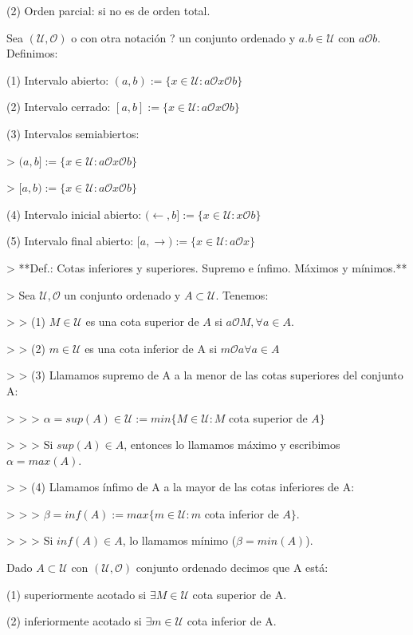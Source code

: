 (2) Orden parcial: si no es de orden total.

Sea $(\mathcal{U},\mathcal{O})$ o con otra notación ? un conjunto ordenado y $a.b \in \mathcal{U}$ con $a \mathcal{O} b$. Definimos:

(1) Intervalo abierto: $(a,b) := \{x \in \mathcal{U}: a \mathcal{O} x \mathcal{O} b\}$

(2) Intervalo cerrado: $[a,b] := \{x \in \mathcal{U}: a \mathcal{O} x \mathcal{O} b\}$

(3) Intervalos semiabiertos:

> $(a,b] := \{x \in \mathcal{U}: a \mathcal{O} x \mathcal{O} b\}$

> $[a,b) := \{x \in \mathcal{U}: a \mathcal{O} x \mathcal{O} b\}$

(4) Intervalo inicial abierto: $(\leftarrow, b] := \{x \in \mathcal{U}: x \mathcal{O} b\}$

(5) Intervalo final abierto: $[a, \rightarrow) := \{x \in \mathcal{U}: a \mathcal{O} x\}$

> **Def.: Cotas inferiores y superiores. Supremo e ínfimo. Máximos y mínimos.**

> Sea $\mathcal{U},\mathcal{O}$ un conjunto ordenado y $A \subset \mathcal{U}$. Tenemos:

> > (1) $M \in \mathcal{U}$ es una cota superior de $A$ si $a \mathcal{O} M, \forall a \in A$.

> > (2) $m \in \mathcal{U}$ es una cota inferior de A si $m \mathcal{O} a \forall a \in A$

> > (3) Llamamos supremo de A a la menor de las cotas superiores del conjunto A:

> > > $\alpha = sup(A) \in \mathcal{U} := min \{M \in \mathcal{U}: M$ cota superior de $A\}$

> > > Si $sup(A) \in A$, entonces lo llamamos máximo y escribimos $\alpha = max(A)$.

> > (4) Llamamos ínfimo de A a la mayor de las cotas inferiores de A:

> > > $\beta = inf(A) := max \{m \in \mathcal{U}: m$ cota inferior de $A\}$.

> > > Si $inf(A) \in A$, lo llamamos mínimo ($\beta = min(A)$).

Dado $A \subset \mathcal{U}$ con $(\mathcal{U}, \mathcal{O})$ conjunto ordenado decimos que A está:

(1) superiormente acotado si $\exists M \in \mathcal{U}$ cota superior de A.

(2) inferiormente acotado si $\exists m \in \mathcal{U}$ cota inferior de A.


